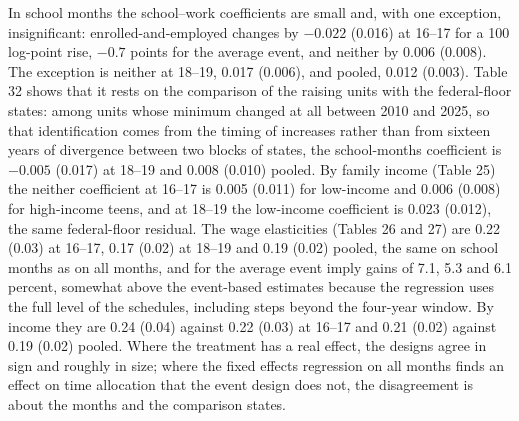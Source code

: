 \documentclass[12pt]{article}
\begin{document}
In school months the school--work coefficients are small and, with one exception, insignificant: enrolled-and-employed changes by $-0.022$ (0.016) at 16--17 for a 100 log-point rise, $-0.7$ points for the average event, and neither by 0.006 (0.008). The exception is neither at 18--19, 0.017 (0.006), and pooled, 0.012 (0.003). Table 32 shows that it rests on the comparison of the raising units with the federal-floor states: among units whose minimum changed at all between 2010 and 2025, so that identification comes from the timing of increases rather than from sixteen years of divergence between two blocks of states, the school-months coefficient is $-0.005$ (0.017) at 18--19 and 0.008 (0.010) pooled. By family income (Table 25) the neither coefficient at 16--17 is 0.005 (0.011) for low-income and 0.006 (0.008) for high-income teens, and at 18--19 the low-income coefficient is 0.023 (0.012), the same federal-floor residual. The wage elasticities (Tables 26 and 27) are 0.22 (0.03) at 16--17, 0.17 (0.02) at 18--19 and 0.19 (0.02) pooled, the same on school months as on all months, and for the average event imply gains of 7.1, 5.3 and 6.1 percent, somewhat above the event-based estimates because the regression uses the full level of the schedules, including steps beyond the four-year window. By income they are 0.24 (0.04) against 0.22 (0.03) at 16--17 and 0.21 (0.02) against 0.19 (0.02) pooled. Where the treatment has a real effect, the designs agree in sign and roughly in size; where the fixed effects regression on all months finds an effect on time allocation that the event design does not, the disagreement is about the months and the comparison states.
\end{document}
